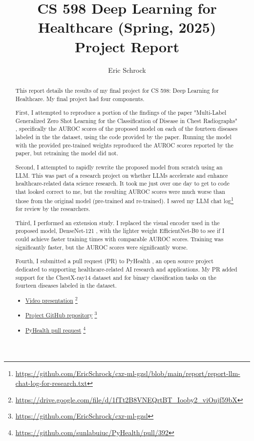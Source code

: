 \documentclass[letterpaper]{article} %
\title{CS 598 Deep Learning for Healthcare (Spring, 2025)\\Project Report}
\author {Eric Schrock}
\begin{document}
\maketitle

\begin{abstract}
This report details the results of my final project for CS 598: Deep Learning for Healthcare. My final project had four components.

First, I attempted to reproduce a portion of the findings of the paper "Multi-Label Generalized Zero Shot Learning for the Classification of Disease in Chest Radiographs" \cite{hayat2021multilabel}, specifically the AUROC scores of the proposed model on each of the fourteen diseases labeled in the the dataset, using the code provided by the paper. Running the model with the provided pre-trained weights reproduced the AUROC scores reported by the paper, but retraining the model did not.

Second, I attempted to rapidly rewrite the proposed model from scratch using an LLM. This was part of a research project on whether LLMs accelerate and enhance healthcare-related data science research. It took me just over one day to get to code that looked correct to me, but the resulting AUROC scores were much worse than those from the original model (pre-trained and re-trained). I saved my LLM chat log\footnote{\url{https://github.com/EricSchrock/cxr-ml-gzsl/blob/main/report/report-llm-chat-log-for-research.txt}} for review by the researchers.

Third, I performed an extension study. I replaced the visual encoder used in the proposed model, DenseNet-121 \cite{huang2018denselyconnectedconvolutionalnetworks}, with the lighter weight EfficientNet-B0 \cite{tan2020efficientnetrethinkingmodelscaling} to see if I could achieve faster training times with comparable AUROC scores. Training was significantly faster, but the AUROC scores were significantly worse.

Fourth, I submitted a pull request (PR) to PyHealth \cite{pyhealth2023yang}, an open source project dedicated to supporting healthcare-related AI research and applications. My PR added support for the ChestX-ray14 dataset \cite{Wang_2017} and for binary classification tasks on the fourteen diseases labeled in the dataset.

\begin{itemize}
    \item \href{https://drive.google.com/file/d/1fTt2B8VNEQrtBT_Iooby2_viOujf59bX}{Video presentation} \footnote{\url{https://drive.google.com/file/d/1fTt2B8VNEQrtBT_Iooby2_viOujf59bX}}
    \item \href{https://github.com/EricSchrock/cxr-ml-gzsl}{Project GitHub repository} \footnote{\url{https://github.com/EricSchrock/cxr-ml-gzsl}}
    \item \href{https://github.com/sunlabuiuc/PyHealth/pull/392}{PyHealth pull request} \footnote{\url{https://github.com/sunlabuiuc/PyHealth/pull/392}}
\end{itemize}
\end{abstract}
\end{document}
